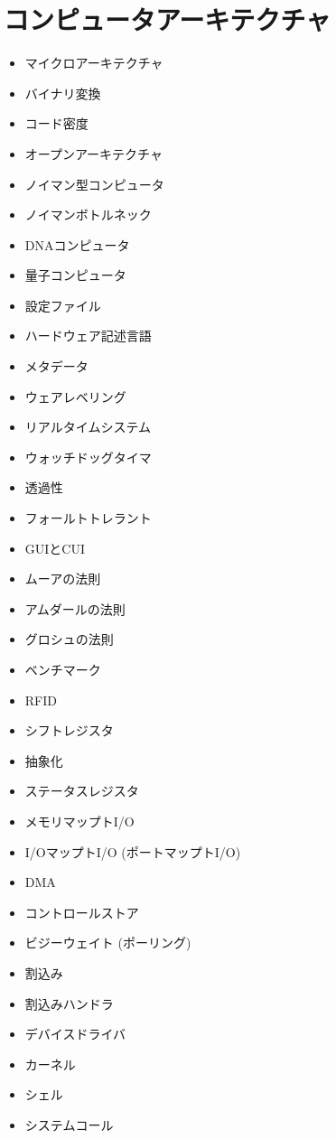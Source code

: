 \documentclass[a4j, titlepage, 11pt]{jsarticle}
\begin{document}
\clearpage

\section{コンピュータアーキテクチャ}
\begin{multicols}{2}
\begin{itemize}
	\item マイクロアーキテクチャ
	\item バイナリ変換
	\item コード密度
	\item オープンアーキテクチャ
	\item ノイマン型コンピュータ
	\item ノイマンボトルネック
	\item DNAコンピュータ
	\item 量子コンピュータ
	\item 設定ファイル
	\item ハードウェア記述言語
	\item メタデータ
	\item ウェアレベリング
	\item リアルタイムシステム
	\item ウォッチドッグタイマ
	\item 透過性
	\item フォールトトレラント
	\item GUIとCUI
	\item ムーアの法則
	\item アムダールの法則
	\item グロシュの法則
	\item ベンチマーク
	\item RFID
	\item シフトレジスタ
	\item 抽象化
	\item ステータスレジスタ
	\item メモリマップトI/O
	\item I/OマップトI/O (ポートマップトI/O)
	\item DMA
	\item コントロールストア
	\item ビジーウェイト (ポーリング)
	\item 割込み
	\item 割込みハンドラ
	\item デバイスドライバ
	\item カーネル
	\item シェル
	\item システムコール

\end{itemize}
\end{multicols}
\end{document}
